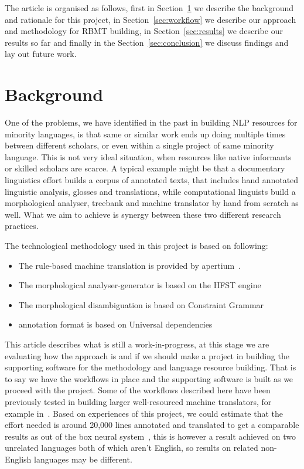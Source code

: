 \documentclass{flammie}
\begin{document}
The article is organised as follows, first in Section~\ref{sec:background} we
describe the background and rationale for this project, in
Section~\ref{sec:workflow} we describe our approach and methodology for RBMT
building, in Section~\ref{sec:results} we describe our results so far and
finally in the Section~\ref{sec:conclusion} we discuss findings and lay out
future work.

\section{Background}\label{sec:background}

One of the problems, we have identified in the past in building NLP resources
for minority languages, is that same or similar work ends up doing multiple
times between different scholars, or even within a single project of same
minority language. This is not very ideal situation, when resources like native
informants or skilled scholars are scarce. A typical example might be that a
documentary linguistics effort builds a corpus of annotated texts, that
includes hand annotated linguistic analysis, glosses and translations, while
computational linguists build a morphological analyser, treebank and machine
translator by hand from scratch as well. What we aim to achieve is synergy
between these two different research practices.

The technological methodology used in this project is based on following:
\begin{itemize}
    \item The rule-based machine translation is provided by
        apertium~\cite{apertium}.
    \item The morphological analyser-generator is based on the HFST
        engine~\cite{linden2009hfst}
    \item The morphological disambiguation is based on Constraint
        Grammar~\cite{karlsson1990constraint}
    \item annotation format is based on Universal dependencies~\cite{ud24}
\end{itemize}

This article describes what is still a work-in-progress, at this stage we are
evaluating how the approach is and if we should make a project in building the
supporting software for the methodology and language resource building. That is
to say we have the workflows in place and the supporting software is built as we
proceed with the project.
Some of the workflows described here have been previously tested in building
larger well-resourced machine translators, for example in~\cite{pirinen2018rulebased}.
Based on experiences of this project, we could estimate that the effort needed
is around 20,000 lines annotated and translated to get a comparable results as
out of the box neural system~\cite{pirinen2019neural}, this is however a
result achieved on two unrelated languages both of which aren't English, so
results on related non-English languages may be different.
\end{document}
